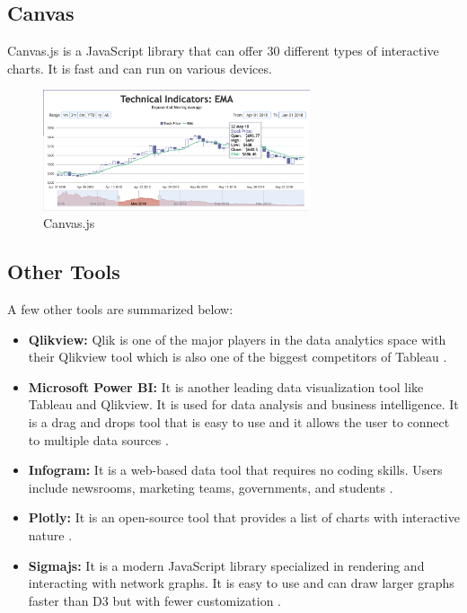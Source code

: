 \subsection{Canvas}
Canvas.js is a JavaScript library that can offer 30 different types of interactive charts. It is fast and can run on various devices.

\begin{figure}[H]
\centering
\captionsetup{justification=centering}
\includegraphics[width=0.7\textwidth]{./pics/canvas.png}
\caption{Canvas.js \cite{canvas}}
\label{fig:canvas}
\end{figure}



\subsection{Other Tools}

A few other tools are summarized below:

\begin{itemize}
    \item \textbf{Qlikview: }Qlik is one of the major players in the data analytics space with their Qlikview tool which is also one of the biggest competitors of Tableau \cite{qlik}.
    \item \textbf{Microsoft Power BI: }It is another leading data visualization tool like Tableau and Qlikview. It is used for data analysis and business intelligence. It is a drag and drops tool that is easy to use and it allows the user to connect to multiple data sources \cite{bi}.
    \item \textbf{Infogram: }It is a web-based data tool that requires no coding skills. Users include newsrooms, marketing teams, governments, and students \cite{infogram}.
    \item \textbf{Plotly: }It is an open-source tool that provides a list of charts with interactive nature \cite{plotly}.
    \item \textbf{Sigmajs: }It is a modern JavaScript library specialized in rendering and interacting with network graphs. It is easy to use and can draw larger graphs faster than D3 but with fewer customization \cite{sigma}.
   
\end{itemize}





